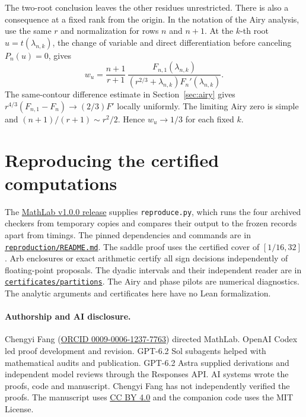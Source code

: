 \documentclass[11pt]{article}
\begin{document}
The two-root conclusion leaves the other residues unrestricted. There
is also a consequence at a fixed rank from the origin. In the notation
of the Airy analysis, use the same \(r\) and normalization for rows \(n\)
and \(n+1\). At the \(k\)-th root \(u=t(\lambda_{n,k})\), the change of variable and direct differentiation
before canceling \(P_n(u)=0\), gives
\[
 w_u=\frac{n+1}{r+1}\,
 \frac{F_{n,1}(\lambda_{n,k})}
 {(r^{2/3}+\lambda_{n,k})F_n'(\lambda_{n,k})}.
\]
The same-contour difference estimate in Section~\ref{sec:airy} gives
\(r^{4/3}(F_{n,1}-F_n)\to(2/3)F'\) locally uniformly. The limiting
Airy zero is simple and \((n+1)/(r+1)\sim r^2/2\). Hence
\(w_u\to1/3\) for each fixed \(k\).

\section{Reproducing the certified computations}\label{app:replay}
The \href{https://github.com/F1Justin/MathLab/tree/v1.0.0}{MathLab v1.0.0 release} supplies \texttt{reproduce.py}, which runs the four archived checkers from temporary copies and compares their output to the frozen records apart from timings. The pinned dependencies and commands are in \href{https://github.com/F1Justin/MathLab/blob/v1.0.0/papers/partitions/reproduction/README.md}{\texttt{reproduction/README.md}}. The saddle proof uses the certified cover of \([1/16,32]\). Arb enclosures or exact arithmetic certify all sign decisions independently of floating-point proposals. The dyadic intervals and their independent reader are in \href{https://github.com/F1Justin/MathLab/tree/v1.0.0/certificates/partitions}{\texttt{certificates/partitions}}. The Airy and phase pilots are numerical diagnostics. The analytic arguments and certificates here have no Lean formalization.

\paragraph{Authorship and AI disclosure.}
Chengyi Fang (\href{https://orcid.org/0009-0006-1237-7763}{ORCID 0009-0006-1237-7763}) directed MathLab. OpenAI Codex led proof development and revision. GPT-6.2 Sol subagents helped with mathematical audits and publication. GPT-6.2 Astra supplied derivations and independent model reviews through the Responses API. AI systems wrote the proofs, code and manuscript. Chengyi Fang has not independently verified the proofs. The manuscript uses \href{https://creativecommons.org/licenses/by/4.0/}{CC BY 4.0} and the companion code uses the MIT License.
\end{document}

